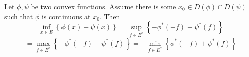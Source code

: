 \begin{thm}
	Let $ \phi, \psi$ be two convex functions. Assume there is some $ x_0 \in D( \phi) \cap D( \psi)$ such that $ \phi$ is continuous at $x_0$. Then
	\[
		\inf_{x \in E} \left\{ \phi(x) + \psi(x) \right\} = \sup_{f \in E^*} \left\{ - \phi^* (-f) - \psi^* (f) \right\}
	\]
	\[
		= \max_{f \in E^*} \left\{ - \phi^* (-f) - \psi^* (f) \right\} = - \min_{f \in E^*} \left\{ \phi^* (-f) + \psi^* (f) \right\}
	\]
	
\end{thm}


























